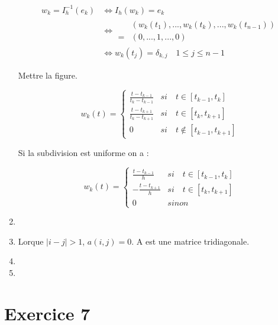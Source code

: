 \documentclass[12pt, letterpaper]{article}
\begin{document}
\begin{enumerate}
  \begin{equation*}
    \begin{split}
      w_k = I_h^{-1}(e_k) & \iff I_h(w_k) = e_k \\
      & \iff
      \begin{split}
        & (w_k(t_1), ..., w_k(t_k), ..., w_k(t_{n-1})) \\
        = & (0, ..., 1, ..., 0)
      \end{split} \\
      & \iff w_k(t_j) = \delta_{k,j} \quad 1 \le j \le n-1
    \end{split}
  \end{equation*}

  Mettre la figure.

  \begin{equation*}
    w_k(t) = 
    \left\{
    \begin{array}{ll}
      \frac{t - t_{k-1}}{t_k - t_{k-1}} & si \quad t \in [t_{k-1},
        t_k] \\
      \frac{t - t_{k+1}}{t_k - t_{k+1}} & si \quad t \in [t_k,
        t_{k+1}] \\
      0 & si \quad t \notin [t_{k-1}, t_{k+1}]
    \end{array}
    \right.
  \end{equation*}

  Si la subdivision est uniforme on a :

  \begin{equation*}
    w_k(t) = 
    \left\{
    \begin{array}{ll}
      \frac{t - t_{k-1}}{h} & si \quad t \in [t_{k-1},
        t_k] \\
      - \frac{t - t_{k+1}}{h} & si \quad t \in [t_k,
        t_{k+1}] \\
      0 & sinon
    \end{array}
    \right.
  \end{equation*}

\item

\item
  Lorque $|i - j| > 1$, $a(i, j) = 0$. A est une matrice tridiagonale.

\item

\item
  

\end{enumerate}

\section*{Exercice 7}
\end{document}

